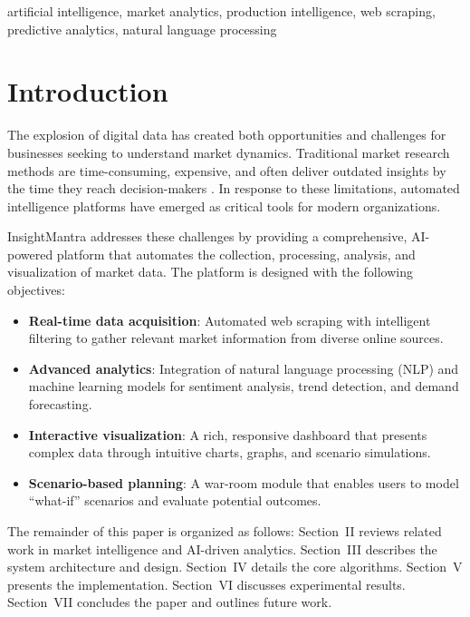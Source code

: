 \documentclass[conference]{IEEEtran}
\begin{document}
\begin{IEEEkeywords}
artificial intelligence, market analytics, production intelligence, web scraping, predictive analytics, natural language processing
\end{IEEEkeywords}

\section{Introduction}

The explosion of digital data has created both opportunities and challenges for businesses seeking to understand market dynamics. Traditional market research methods are time-consuming, expensive, and often deliver outdated insights by the time they reach decision-makers \cite{b1}. In response to these limitations, automated intelligence platforms have emerged as critical tools for modern organizations.

InsightMantra addresses these challenges by providing a comprehensive, AI-powered platform that automates the collection, processing, analysis, and visualization of market data. The platform is designed with the following objectives:

\begin{itemize}
    \item \textbf{Real-time data acquisition}: Automated web scraping with intelligent filtering to gather relevant market information from diverse online sources.
    \item \textbf{Advanced analytics}: Integration of natural language processing (NLP) and machine learning models for sentiment analysis, trend detection, and demand forecasting.
    \item \textbf{Interactive visualization}: A rich, responsive dashboard that presents complex data through intuitive charts, graphs, and scenario simulations.
    \item \textbf{Scenario-based planning}: A war-room module that enables users to model ``what-if'' scenarios and evaluate potential outcomes.
\end{itemize}

The remainder of this paper is organized as follows: Section~II reviews related work in market intelligence and AI-driven analytics. Section~III describes the system architecture and design. Section~IV details the core algorithms. Section~V presents the implementation. Section~VI discusses experimental results. Section~VII concludes the paper and outlines future work.
\end{document}
